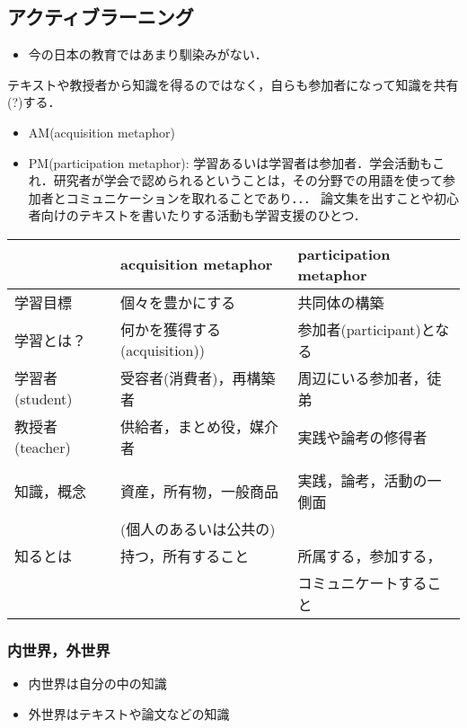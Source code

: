 \documentclass[a4j,twocolumn]{jsarticle}
\begin{document}
\subsection{アクティブラーニング}
\label{sec-2-5}
\begin{itemize}
\item 今の日本の教育ではあまり馴染みがない．
\end{itemize}
テキストや教授者から知識を得るのではなく，自らも参加者になって知識を共有(?)する．
\begin{itemize}
\item AM(acquisition metaphor)
\item PM(participation metaphor): 学習あるいは学習者は参加者．学会活動もこれ．研究者が学会で認められるということは，その分野での用語を使って参加者とコミュニケーションを取れることであり．．．
論文集を出すことや初心者向けのテキストを書いたりする活動も学習支援のひとつ．
\end{itemize}

\begin{center}
\begin{tabular}{lll}
 & acquisition metaphor & participation metaphor\\
\hline
学習目標 & 個々を豊かにする & 共同体の構築\\
\hline
学習とは？ & 何かを獲得する(acquisition)) & 参加者(participant)となる\\
\hline
学習者(student) & 受容者(消費者)，再構築者　 & 周辺にいる参加者，徒弟\\
\hline
教授者(teacher) & 供給者，まとめ役，媒介者 & 実践や論考の修得者\\
 &  & \\
\hline
知識，概念 & 資産，所有物，一般商品 & 実践，論考，活動の一側面\\
 & (個人のあるいは公共の) & \\
\hline
知るとは & 持つ，所有すること & 所属する，参加する，\\
 &  & コミュニケートすること\\
\hline
\end{tabular}
\end{center}


\subsubsection*{内世界，外世界}
\label{sec-2-5-1}
\begin{itemize}
\item 内世界は自分の中の知識

\item 外世界はテキストや論文などの知識
\end{itemize}
\end{document}
